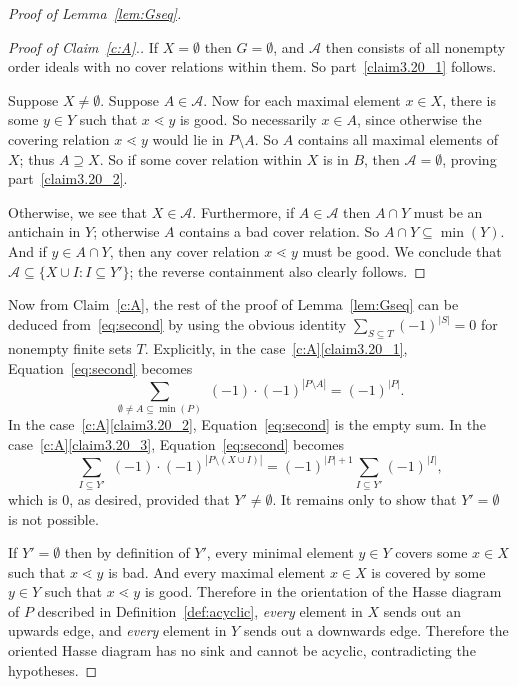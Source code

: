 \documentclass[ALCO,ThmDefs,Unicode,epreuves]{cedram}
\begin{document}
\begin{proof}[Proof of Lemma~\ref{lem:Gseq}]
\begin{proof}[Proof of Claim~\ref{c:A}.] If $X=\emptyset$ then $G=\emptyset$, and $\mathcal{A}$ then consists of all nonempty order ideals with no cover relations within them. So part~\eqref{claim3.20_1} follows.

Suppose $X\ne \emptyset$. Suppose $A\in \mathcal{A}$. Now for each maximal element $x\in X$, there is some $y\in Y$ such that $x\lessdot y$ is good. So necessarily $x\in A$, since otherwise the covering relation $x\lessdot y$ would lie in $P\setminus A$. So $A$ contains all maximal elements of $X$; thus $A\supseteq X$. So if some cover relation within $X$ is in $B$, then $\mathcal{A}=\emptyset$, proving part~\eqref{claim3.20_2}. 

Otherwise, we see that $X\in\mathcal{A}$. Furthermore, if $A\in\mathcal{A}$ then $A\cap Y$ must be an antichain in $Y$; otherwise $A$ contains a bad cover relation. So $A\cap Y\subseteq \min(Y)$. And if $y\in A\cap Y$, then any cover relation $x\lessdot y$ must be good. We conclude that $\mathcal{A} \subseteq \{X\cup I: I\subseteq Y'\}$; the reverse containment also clearly follows.
\end{proof}

Now from Claim~\ref{c:A}, the rest of the proof of Lemma~\ref{lem:Gseq} can be deduced from~\eqref{eq:second} by using the obvious identity 
$\sum_{S\subseteq T} (-1)^{|S|} = 0$
for nonempty finite sets $T$. Explicitly, in the case~\ref{c:A}\eqref{claim3.20_1}, Equation~\eqref{eq:second} becomes 
\[
\sum_{\emptyset\ne A \subseteq \min(P)} \,\,(-1)\cdot(-1)^{|P\setminus A|} = (-1)^{|P|}.
\]
In the case~\ref{c:A}\eqref{claim3.20_2}, Equation~\eqref{eq:second} is the empty sum. 
In the case~\ref{c:A}\eqref{claim3.20_3}, Equation~\eqref{eq:second} becomes
\[
\sum_{I\subseteq Y'} \,\,(-1)\cdot(-1)^{|P\setminus(X \cup I)|} = (-1)^{|P|+1}\sum_{I\subseteq Y'} (-1)^{|I|},
\]
which is $0$, as desired, provided that $Y'\ne \emptyset$. It remains only to show that $Y'=\emptyset$ is not possible.

If $Y'=\emptyset$ then by definition of $Y'$, every minimal element $y\in Y$ covers some $x\in X$ such that $x\lessdot y$ is bad. And every maximal element $x\in X$ is covered by some $y \in Y$ such that $x\lessdot y$ is good. Therefore in the orientation of the Hasse diagram of $P$ described in Definition~\ref{def:acyclic}, \emph{every} element in $X$ sends out an upwards edge, and \emph{every} element in $Y$ sends out a downwards edge. Therefore the oriented Hasse diagram has no sink and cannot be acyclic, contradicting the hypotheses.
\end{proof}
\end{document}
